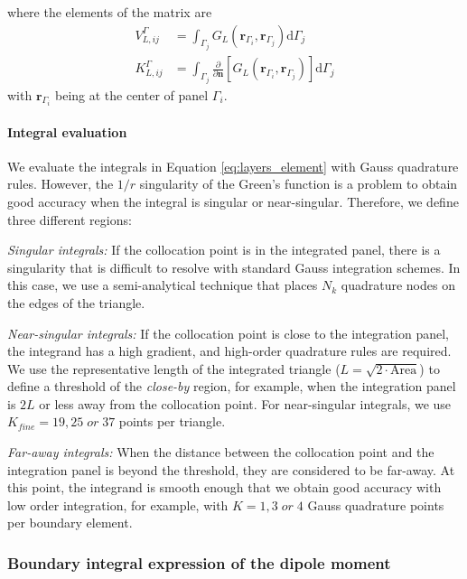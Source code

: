\noindent where the elements of the matrix are
%
\begin{align} \label{eq:layers_element}
V_{L,ij}^{\Gamma} &= \int_{\Gamma_j} G_L(\mathbf{r}_{\Gamma_i},\mathbf{r}_{\Gamma_j})  \mathrm{d} \Gamma_j \nonumber \\
K_{L,ij}^{\Gamma} &= \int_{\Gamma_j} \frac{\partial}{\partial \mathbf{n}} \left[ G_L(\mathbf{r}_{\Gamma_i},\mathbf{r}_{\Gamma_j}) \right]\mathrm{d} \Gamma_j
\end{align}
%
\noindent with $\mathbf{r}_{\Gamma_i}$ being at the center of panel $\Gamma_i$.


\paragraph{Integral evaluation}

We evaluate the integrals in Equation \eqref{eq:layers_element} with Gauss quadrature
rules. However, the $1/r$ singularity of the Green's function is a
problem to obtain good accuracy when the integral is 
singular or near-singular. Therefore, we define three different regions:

\emph{Singular integrals:} If the collocation point is in the integrated panel,
there is a singularity that is difficult to resolve with standard
Gauss integration schemes. In this case, we use a semi-analytical technique 
\cite{HessSmith1967,ZhuHuangSongWhite2001} that places $N_k$ quadrature nodes on the 
edges of the triangle.

\emph{Near-singular integrals:} If the collocation point is close to the integration panel,
the integrand has a high gradient, and high-order quadrature rules are required. 
We use the representative length of the integrated triangle ($L = \sqrt{2\cdot\text{Area}}$)
to define a threshold of the \emph{close-by} region, for example, when the integration panel 
is $2L$ or less away from the collocation point. For near-singular integrals, we use 
$K_{fine}=19, 25 \; or \; 37$ points per triangle. 

\emph{Far-away integrals:} When the distance between the collocation point and the integration
panel is beyond the threshold, they are considered to be far-away. 
At this point, the integrand is smooth enough that we obtain good 
accuracy with low order integration, for example, with 
$K=1, 3 \; or \; 4$ Gauss quadrature points per boundary element. 

\subsubsection{Boundary integral expression of the dipole moment}

